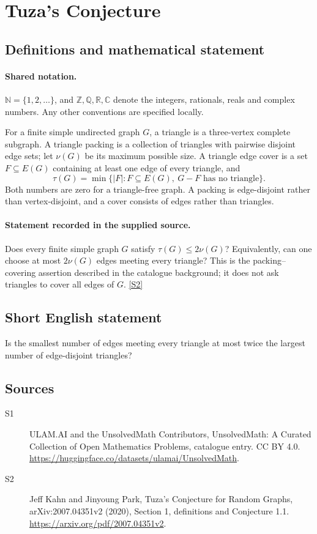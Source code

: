 \documentclass[11pt]{article}
\newcommand{\sref}[2]{\hyperlink{source:#1:#2}{[S#2]}}
\begin{document}
\section{Tuza's Conjecture}\label{statement}

\subsection{Definitions and mathematical statement}

\paragraph{Shared notation.}$\mathbb N=\{1,2,\ldots\}$, and $\mathbb Z,\mathbb Q,\mathbb R,\mathbb C$ denote the integers, rationals, reals and complex numbers. Any other conventions are specified locally.


For a finite simple undirected graph $G$, a triangle is a three-vertex complete subgraph. A triangle packing is a collection of triangles with pairwise disjoint edge sets; let $\nu(G)$ be its maximum possible size. A triangle edge cover is a set $F\subseteq E(G)$ containing at least one edge of every triangle, and
\[
 \tau(G)=\min\{|F|:F\subseteq E(G),\ G-F\text{ has no triangle}\}.
\]
Both numbers are zero for a triangle-free graph. A packing is edge-disjoint rather than vertex-disjoint, and a cover consists of edges rather than triangles.
\paragraph{Statement recorded in the supplied source.}
Does every finite simple graph $G$ satisfy $\tau(G)\le2\nu(G)$? Equivalently, can one choose at most $2\nu(G)$ edges meeting every triangle? This is the packing--covering assertion described in the catalogue background; it does not ask triangles to cover all edges of $G$. \sref{statement}{2}
\subsection{Short English statement}
Is the smallest number of edges meeting every triangle at most twice the largest number of edge-disjoint triangles?
\subsection{Sources}
\begin{description}
\item[\hypertarget{source:statement:1}{S1}] ULAM.AI and the UnsolvedMath Contributors, UnsolvedMath: A Curated Collection of Open Mathematics Problems, catalogue entry. CC BY 4.0. \url{https://huggingface.co/datasets/ulamai/UnsolvedMath}.
\item[\hypertarget{source:statement:2}{S2}] Jeff Kahn and Jinyoung Park, Tuza’s Conjecture for Random Graphs, arXiv:2007.04351v2 (2020), Section 1, definitions and Conjecture 1.1. \url{https://arxiv.org/pdf/2007.04351v2}.
\end{description}
\label{end:statement}
\end{document}
